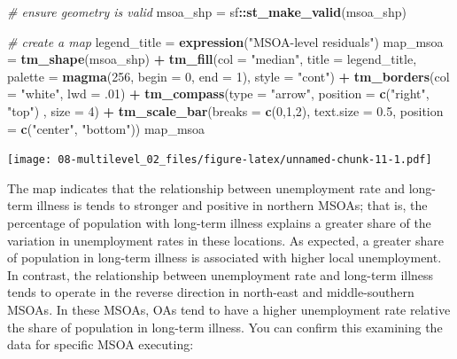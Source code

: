 \documentclass[
]{book}
\newenvironment{Shaded}{\begin{snugshade}}{\end{snugshade}}
\newcommand{\CommentTok}[1]{\textcolor[rgb]{0.56,0.35,0.01}{\textit{#1}}}
\newcommand{\DataTypeTok}[1]{\textcolor[rgb]{0.13,0.29,0.53}{#1}}
\newcommand{\DecValTok}[1]{\textcolor[rgb]{0.00,0.00,0.81}{#1}}
\newcommand{\FloatTok}[1]{\textcolor[rgb]{0.00,0.00,0.81}{#1}}
\newcommand{\KeywordTok}[1]{\textcolor[rgb]{0.13,0.29,0.53}{\textbf{#1}}}
\newcommand{\NormalTok}[1]{#1}
\newcommand{\OperatorTok}[1]{\textcolor[rgb]{0.81,0.36,0.00}{\textbf{#1}}}
\newcommand{\StringTok}[1]{\textcolor[rgb]{0.31,0.60,0.02}{#1}}
\begin{document}
\begin{Shaded}
\begin{Highlighting}[]
\CommentTok{# ensure geometry is valid}
\NormalTok{msoa_shp =}\StringTok{ }\NormalTok{sf}\OperatorTok{::}\KeywordTok{st_make_valid}\NormalTok{(msoa_shp)}

\CommentTok{# create a map}
\NormalTok{legend_title =}\StringTok{ }\KeywordTok{expression}\NormalTok{(}\StringTok{"MSOA-level residuals"}\NormalTok{)}
\NormalTok{map_msoa =}\StringTok{ }\KeywordTok{tm_shape}\NormalTok{(msoa_shp) }\OperatorTok{+}
\StringTok{  }\KeywordTok{tm_fill}\NormalTok{(}\DataTypeTok{col =} \StringTok{"median"}\NormalTok{, }\DataTypeTok{title =}\NormalTok{ legend_title, }\DataTypeTok{palette =} \KeywordTok{magma}\NormalTok{(}\DecValTok{256}\NormalTok{, }\DataTypeTok{begin =} \DecValTok{0}\NormalTok{, }\DataTypeTok{end =} \DecValTok{1}\NormalTok{), }\DataTypeTok{style =} \StringTok{"cont"}\NormalTok{) }\OperatorTok{+}\StringTok{ }
\StringTok{  }\KeywordTok{tm_borders}\NormalTok{(}\DataTypeTok{col =} \StringTok{"white"}\NormalTok{, }\DataTypeTok{lwd =} \FloatTok{.01}\NormalTok{)  }\OperatorTok{+}\StringTok{ }
\StringTok{  }\KeywordTok{tm_compass}\NormalTok{(}\DataTypeTok{type =} \StringTok{"arrow"}\NormalTok{, }\DataTypeTok{position =} \KeywordTok{c}\NormalTok{(}\StringTok{"right"}\NormalTok{, }\StringTok{"top"}\NormalTok{) , }\DataTypeTok{size =} \DecValTok{4}\NormalTok{) }\OperatorTok{+}\StringTok{ }
\StringTok{  }\KeywordTok{tm_scale_bar}\NormalTok{(}\DataTypeTok{breaks =} \KeywordTok{c}\NormalTok{(}\DecValTok{0}\NormalTok{,}\DecValTok{1}\NormalTok{,}\DecValTok{2}\NormalTok{), }\DataTypeTok{text.size =} \FloatTok{0.5}\NormalTok{, }\DataTypeTok{position =}  \KeywordTok{c}\NormalTok{(}\StringTok{"center"}\NormalTok{, }\StringTok{"bottom"}\NormalTok{)) }
\NormalTok{map_msoa}
\end{Highlighting}
\end{Shaded}

\texttt{[image: 08-multilevel\_02\_files/figure-latex/unnamed-chunk-11-1.pdf]}

The map indicates that the relationship between unemployment rate and long-term illness is tends to stronger and positive in northern MSOAs; that is, the percentage of population with long-term illness explains a greater share of the variation in unemployment rates in these locations. As expected, a greater share of population in long-term illness is associated with higher local unemployment. In contrast, the relationship between unemployment rate and long-term illness tends to operate in the reverse direction in north-east and middle-southern MSOAs. In these MSOAs, OAs tend to have a higher unemployment rate relative the share of population in long-term illness. You can confirm this examining the data for specific MSOA executing:
\end{document}
